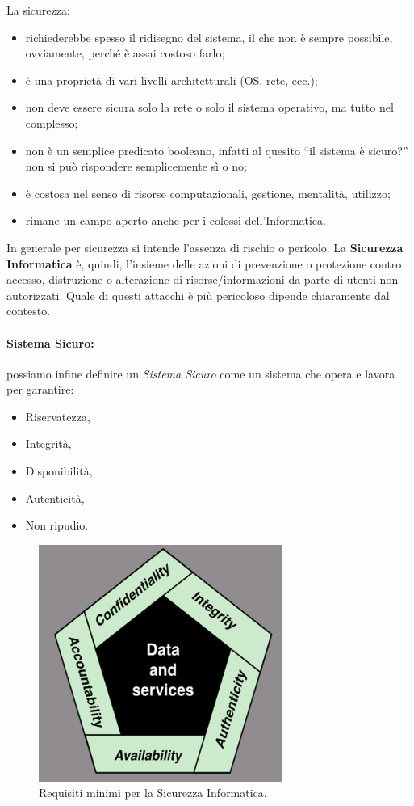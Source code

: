 La sicurezza:

\begin{itemize}
    \item richiederebbe spesso il ridisegno del sistema, il che non è sempre
          possibile, ovviamente, perché è assai costoso farlo;
    \item è una proprietà di vari livelli architetturali (OS, rete, ecc.);
    \item non deve essere sicura solo la rete o solo il sistema operativo,
          ma tutto nel complesso;
    \item non è un semplice predicato booleano, infatti al quesito
          “il sistema è sicuro?” non si può
          rispondere semplicemente sì o no;
    \item è costosa nel senso di risorse computazionali, gestione, mentalità, utilizzo;
    \item rimane un campo aperto anche per i colossi dell’Informatica.
\end{itemize}

In generale per sicurezza si intende l’assenza di rischio o pericolo.
La \textbf{Sicurezza Informatica} è, quindi, l’insieme delle azioni di prevenzione
o protezione contro accesso, distruzione o alterazione di risorse/informazioni
da parte di utenti non autorizzati. Quale di questi attacchi è più pericoloso
dipende chiaramente dal contesto.

\paragraph{Sistema Sicuro:} possiamo infine definire un \textit{Sistema Sicuro}
come un sistema che opera e lavora per garantire:

\begin{itemize}
    \item Riservatezza,
    \item Integrità,
    \item Disponibilità,
    \item Autenticità,
    \item Non ripudio.
\end{itemize}

\begin{figure}[H]
    \centering
    \includegraphics[width=8cm, keepaspectratio]{capitoli/cap_1/imgs/cia.png}
    \caption{Requisiti minimi per la Sicurezza Informatica.}
\end{figure}